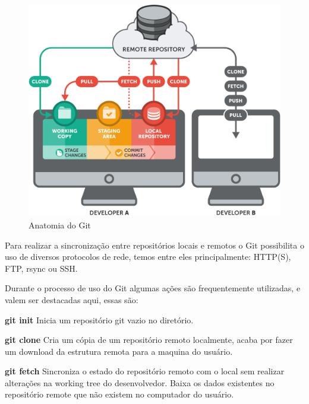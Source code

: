 \documentclass[]{politex}
\begin{document}
	\begin{figure}[!htbp]
		\caption{\label{fig_git1}Anatomia do Git}
		\begin{center}
		\includegraphics[scale=0.4]{git.png}
		\end{center}
	\end{figure}
	
	Para realizar a sincronização entre repositórios locais e remotos o Git possibilita o uso de diversos protocolos de rede, temos entre eles principalmente: HTTP(S), FTP, rsync ou SSH.
	
	Durante o processo de uso do Git algumas ações são frequentemente utilizadas, e valem ser destacadas aqui, essas são:
	
	\textbf{git init}
	\newline
	Inicia um repositório git vazio no diretório.
	
	\textbf{git clone}
	\newline
	Cria um cópia de um repositório remoto localmente, acaba por fazer um download da estrutura remota para a maquina do usuário.
	
	\textbf{git fetch}
	\newline
	Sincroniza o estado do repositório remoto com o local sem realizar alterações na working tree do desenvolvedor. Baixa os dados existentes no repositório remote que não existem no computador do usuário.
	
\end{document}
